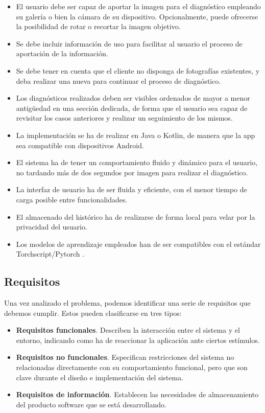 \begin{itemize}

	\item El usuario debe ser capaz de aportar la imagen para el diagnóstico empleando su galería o bien la cámara de su dispositivo. Opcionalmente, puede ofrecerse la posibilidad de rotar o recortar la imagen objetivo.
	\item Se debe incluir información de uso para facilitar al usuario el proceso de aportación de la información.
	\item Se debe tener en cuenta que el cliente no disponga de fotografías existentes, y deba realizar una nueva para continuar el proceso de diagnóstico.
	\item Los diagnósticos realizados deben ser visibles ordenados de mayor a menor antigüedad en una sección dedicada, de forma que el usuario sea capaz de revisitar los casos anteriores y realizar un seguimiento de los mismos.
	\item La implementación se ha de realizar en Java o Kotlin, de manera que la app sea compatible con dispositivos Android.
	\item El sistema ha de tener un comportamiento fluido y dinámico para el usuario, no tardando más de dos segundos por imagen para realizar el diagnóstico.
	\item La interfaz de usuario ha de ser fluida y eficiente, con el menor tiempo de carga posible entre funcionalidades.
	\item El almacenado del histórico ha de realizarse de forma local para velar por la privacidad del usuario.
	\item Los modelos de aprendizaje empleados han de ser compatibles con el estándar Torchscript/Pytorch \cite{paszke2019pytorch}.
\end{itemize}

\subsection{Requisitos}

Una vez analizado el problema, podemos identificar una serie de requisitos que debemos cumplir. Estos pueden clasificarse en tres tipos:

\begin{itemize}
	\item \textbf{Requisitos funcionales}. Describen la interacción entre el sistema y el entorno, indicando como ha de reaccionar la aplicación ante ciertos estímulos.
	\item \textbf{Requisitos no funcionales}. Especifican restricciones del sistema no relacionadas directamente con su comportamiento funcional, pero que son clave durante el diseño e implementación del sistema.
	\item \textbf{Requisitos de información}. Establecen las necesidades de almacenamiento del producto software que se está desarrollando.
\end{itemize}

